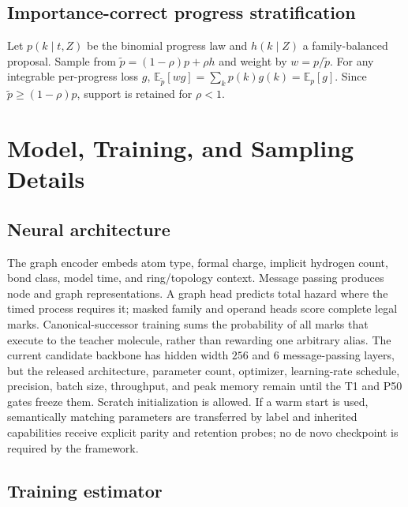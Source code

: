 \documentclass{article}
\newcommand{\E}{\mathbb{E}}
\theoremstyle{definition}
\theoremstyle{remark}
\begin{document}
\subsection{Importance-correct progress stratification}

Let $p(k\mid t,Z)$ be the binomial progress law and $h(k\mid Z)$ a family-balanced proposal. Sample from $\widetilde p=(1-\rho)p+\rho h$ and weight by $w=p/\widetilde p$. For any integrable per-progress loss $g$, $\E_{\widetilde p}[wg]=\sum_kp(k)g(k)=\E_p[g]$. Since $\widetilde p\ge(1-\rho)p$, support is retained for $\rho<1$.

\section{Model, Training, and Sampling Details}\label{app:model}

\subsection{Neural architecture}

The graph encoder embeds atom type, formal charge, implicit hydrogen count, bond class, model time, and ring/topology context. Message passing produces node and graph representations. A graph head predicts total hazard where the timed process requires it; masked family and operand heads score complete legal marks. Canonical-successor training sums the probability of all marks that execute to the teacher molecule, rather than rewarding one arbitrary alias. The current candidate backbone has hidden width $256$ and $6$ message-passing layers, but the released architecture, parameter count, optimizer, learning-rate schedule, precision, batch size, throughput, and peak memory remain \XXX{} until the T1 and P50 gates freeze them. Scratch initialization is allowed. If a warm start is used, semantically matching parameters are transferred by label and inherited capabilities receive explicit parity and retention probes; no de novo checkpoint is required by the framework.

\subsection{Training estimator}
\end{document}
